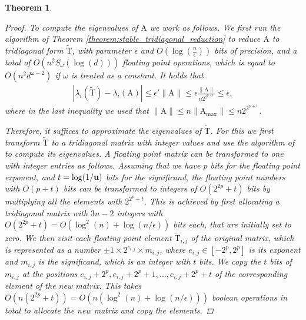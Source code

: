 \documentclass{article}
\newcommand{\labs}{\left|}
\newcommand{\rabs}{\right|}
\newcommand{\lpar}{\left(}
\newcommand{\rpar}{\right)}
\newtheorem{theorem}{Theorem}[section]
\newcommand\matA{\boldsymbol{\mathrm{A}}}
\newcommand\matTtilde{\widetilde{\boldsymbol{\mathrm{T}}}}
\newcommand{\umach}{\textbf{\textup{u}}}
\newcommand{\matmulexponent}{\omega}
\begin{document}
\begin{theorem}
\begin{proof}
        To compute the eigenvalues of $\matA$ we work as follows.
        We first run the algorithm of Theorem \ref{theorem:stable_tridiagonal_reduction} to reduce $\matA$ to tridiagonal form $\matTtilde$, with parameter $\epsilon$ and
        $
            O\lpar
                \log(\tfrac{n}{\epsilon})
            \rpar
        $
        bits of precision, and a total of $O(n^2S_{\matmulexponent}(\log(d)))$ floating point operations, which is equal to $O(n^2d^{\matmulexponent-2})$ if $\omega$ is treated as a constant.
        It holds that
        \begin{align*}
            \labs 
                \lambda_i(\matTtilde) - \lambda_i(\matA)
            \rabs
            \leq \epsilon'\|\matA\|
            \leq
            \epsilon \frac{\|\matA\|}{n2^{2^{p+1}}}
            \leq
            \epsilon,
        \end{align*}
        where in the last inequality we used that $\|\matA\|\leq n\|\matA_{\max}\|\leq n 2^{2^{p+1}}$.
        
        Therefore, it suffices to approximate the eigenvalues of $\matTtilde$. For this we first transform $\matTtilde$ to a tridiagonal matrix with integer values and use the algorithm of \cite{bini1991parallel} to compute its eigenvalues.
        A floating point matrix can be transformed to one with integer entries as follows. 
        Assuming that we have $p$ bits for the floating point exponent, and $t=\log(1/\umach)$ bits for the significand, the floating point numbers with $O(p+t)$ bits can be transformed to integers of $O(2^{2p}+t)$ bits by multiplying all the elements with $2^{2^p+t}$. 
        This is achieved by first allocating a tridiagonal matrix with $3n-2$ integers with $O(2^{2p}+t)=O(\log^2(n)+\log(n/\epsilon))$ bits each, that are initially set to zero. 
        We then visit each floating point element $\matTtilde_{i,j}$ of the original matrix, which is represented as a number $\pm 1\times 2^{e_{i,j}}\times m_{i,j}$, where $e_{i,j}\in[-2^{p},2^p]$ is its exponent and $m_{i,j}$ is the significand, which is an integer with $t$ bits. 
        We copy the $t$ bits of $m_{i,j}$ at the positions $e_{i,j}+2^p,e_{i,j}+2^p+1,\ldots, e_{i,j}+2^p+t$ of the corresponding element of the new matrix. 
        This takes $O(n(2^{2p}+t))=O(n(\log^2(n)+\log(n/\epsilon)))$ boolean operations in total to allocate the new matrix and copy the elements. 
        

\end{proof}
\end{theorem}
\end{document}

